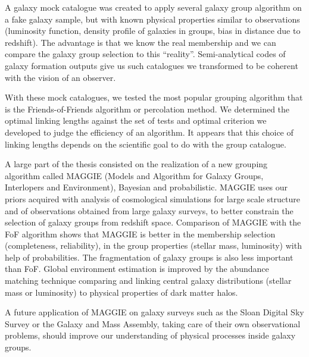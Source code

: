 \begin{bartabstract}
    A galaxy mock catalogue was created to apply several galaxy group algorithm
    on a fake galaxy sample, but with known physical properties similar to
    observations (luminosity function, density profile of galaxies in groups,
    bias in distance due to redshift). The advantage is that we know the real
    membership and we can compare the galaxy group selection to this
    ``reality''. Semi-analytical codes of galaxy formation outputs give us such
    catalogues we transformed to be coherent with the vision of an observer.

    With these mock catalogues, we tested the most popular grouping algorithm
    that is the Friends-of-Friends algorithm or percolation method. We
    determined the optimal linking lengths against the set of tests and optimal
    criterion we developed to judge the efficiency of an algorithm. It appears
    that this choice of linking lengths depends on the scientific goal to do
    with the group catalogue.

    A large part of the thesis consisted on the realization of a new grouping
    algorithm called MAGGIE (Models and Algorithm for Galaxy Groups,
    Interlopers and Environment), Bayesian and probabilistic. MAGGIE uses our
    priors acquired with analysis of cosmological simulations for large scale
    structure and of observations obtained from large galaxy surveys, to better
    constrain the selection of galaxy groups from redshift space. Comparison of
    MAGGIE with the FoF algorithm shows that MAGGIE is better in the membership
    selection (completeness, reliability), in the group properties (stellar
    mass, luminosity) with help of probabilities. The fragmentation of galaxy
    groups is also less important than FoF. Global environment estimation is
    improved by the abundance matching technique comparing and linking central
    galaxy distributions (stellar mass or luminosity) to physical properties of
    dark matter halos.

    A future application of MAGGIE on galaxy surveys such as the Sloan Digital
    Sky Survey or the Galaxy and Mass Assembly, taking care of their own
    observational problems, should improve our understanding of physical
    processes inside galaxy groups.
\end{bartabstract}
\nopagebreak%
